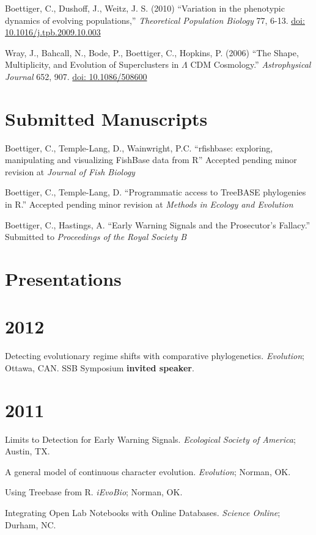 \documentclass[margin]{res}
\begin{document}
\begin{resume}
Boettiger, C., Dushoff, J., Weitz, J. S. (2010) ``Variation in the phenotypic dynamics of evolving populations,'' {\it Theoretical Population Biology} 77, 6-13. \href{http://dx.doi.org/10.1016/j.tpb.2009.10.003}{doi: 10.1016/j.tpb.2009.10.003}

Wray, J., Bahcall, N., Bode, P., Boettiger, C., Hopkins, P.  (2006)  ``The Shape, Multiplicity, and Evolution of Superclusters in $\Lambda$ CDM Cosmology.''  {\it Astrophysical Journal} 652, 907. \href{http://dx.doi.org/10.1086/508600}{doi: 10.1086/508600}


\section{Submitted Manuscripts}

Boettiger, C., Temple-Lang, D., Wainwright, P.C. ``rfishbase: exploring, manipulating and visualizing FishBase data from R'' Accepted pending minor revision at {\it Journal of Fish Biology}

Boettiger, C., Temple-Lang, D.  ``Programmatic access to TreeBASE phylogenies in R.'' Accepted pending minor revision at {\it Methods in Ecology and Evolution}

Boettiger, C., Hastings, A. ``Early Warning Signals and the Prosecutor's Fallacy.'' Submitted to {\it Proceedings of the Royal Society B}


\section{Presentations} 

\section{\textnormal{2012}}
  Detecting evolutionary regime shifts with comparative phylogenetics. \emph{Evolution}; Ottawa, CAN. SSB Symposium \textbf{invited speaker}.

\section{\textnormal{2011}}
  Limits to Detection for Early Warning Signals. \emph{Ecological Society of America}; Austin, TX. 

  A general model of continuous character evolution. \emph{Evolution}; Norman, OK. 

  Using Treebase from R. \emph{iEvoBio}; Norman, OK. 

  Integrating Open Lab Notebooks with Online Databases. \emph{Science Online}; Durham, NC.


\end{resume}
\end{document}
